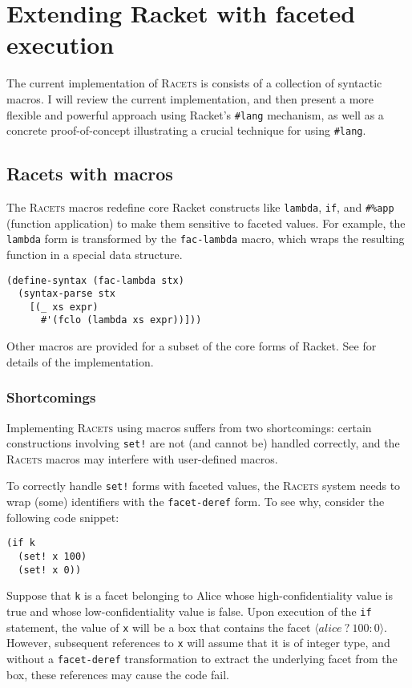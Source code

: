 \documentclass{article}
\begin{document}
\section{Extending Racket with faceted execution\label{sec:lang}}
The current implementation of \textsc{Racets} is consists of a collection of syntactic macros. I will review the current implementation, and then present a more flexible and powerful approach using Racket's \texttt{\#lang} mechanism, as well as a concrete proof-of-concept illustrating a crucial technique for using \texttt{\#lang}.


\subsection{Racets with macros}
The \textsc{Racets} macros redefine core Racket constructs like \texttt{lambda}, \texttt{if}, and \texttt{\#\%app} (function application) to make them sensitive to faceted values. For example, the \texttt{lambda} form is transformed by the \texttt{fac-lambda} macro, which wraps the resulting function in a special data structure.

\begin{lstlisting}
(define-syntax (fac-lambda stx)
  (syntax-parse stx
    [(_ xs expr)
      #'(fclo (lambda xs expr))]))
\end{lstlisting}

Other macros are provided for a subset of the core forms of Racket. See \cite{racets} for details of the implementation.


\subsubsection{Shortcomings}
Implementing \textsc{Racets} using macros suffers from two shortcomings: certain constructions involving \texttt{set!} are not (and cannot be) handled correctly, and the \textsc{Racets} macros may interfere with user-defined macros.

To correctly handle \texttt{set!} forms with faceted values, the \textsc{Racets} system needs to wrap (some) identifiers with the \texttt{facet-deref} form. To see why, consider the following code snippet:

\begin{lstlisting}
(if k
  (set! x 100)
  (set! x 0))
\end{lstlisting}

Suppose that \texttt{k} is a facet belonging to Alice whose high-confidentiality value is true and whose low-confidentiality value is false. Upon execution of the \texttt{if} statement, the value of \texttt{x} will be a box that contains the facet $\langle \textit{alice}\ ?\ 100 : 0 \rangle$. However, subsequent references to \texttt{x} will assume that it is of integer type, and without a \texttt{facet-deref} transformation to extract the underlying facet from the box, these references may cause the code fail.
\end{document}
